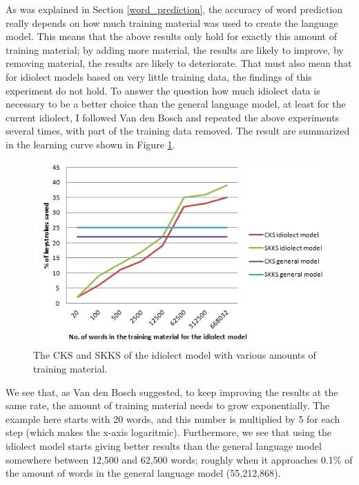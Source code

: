 \documentclass[11pt]{article}
\begin{document}
As was explained in Section \ref{word_prediction}, the accuracy of word prediction really depends on how much training material was used to create the language model. This means that the above results only hold for exactly this amount of training material; by adding more material, the results are likely to improve, by removing material, the results are likely to deteriorate. That must also mean that for idiolect models based on very little training data, the findings of this experiment do not hold. To answer the question how much idiolect data is necessary to be a better choice than the general language model, at least for the current idiolect, I followed Van den Bosch  and repeated the above experiments several times, with part of the training data removed. The result are summarized in the learning curve shown in Figure \ref{lcurve}.

\begin{figure}[H] \centering
\includegraphics[scale=1]{lcurve}
\caption{The CKS and SKKS of the idiolect model with various amounts of training material.}
\label{lcurve}
\end{figure} 

We see that, as Van den Bosch  suggested, to keep improving the results at the same rate, the amount of training material needs to grow exponentially. The example here starts with 20 words, and this number is multiplied by 5 for each step (which makes the x-axis logaritmic). Furthermore, we see that using the idiolect model starts giving better results  than the general language model somewhere between 12,500 and 62,500 words; roughly when it approaches 0.1\% of the amount of words in the general language model (55,212,868).
\end{document}
